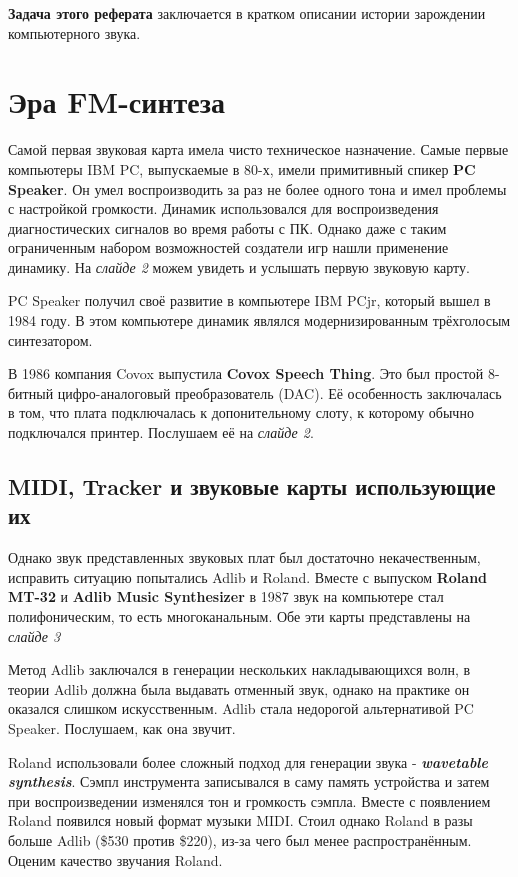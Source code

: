 \documentclass[a4paper,12pt]{extarticle}
\begin{document}
	\textbf{Задача этого реферата} заключается в кратком описании истории зарождении компьютерного звука.
	\newpage
	
	
	\section{Эра FM-синтеза}
	Самой первая звуковая карта имела чисто техническое назначение. Самые первые компьютеры IBM PC, выпускаемые в 80-х, имели примитивный спикер \textbf{PC Speaker}. Он умел воспроизводить за раз не более одного тона и имел проблемы с настройкой громкости. Динамик использовался для воспроизведения диагностических сигналов во время работы с ПК. Однако даже с таким ограниченным набором возможностей создатели игр нашли применение динамику. На \textit{слайде 2} можем увидеть и услышать первую звуковую карту.
	
	PC Speaker получил своё развитие в компьютере IBM PCjr, который вышел в 1984 году. В этом компьютере динамик являлся модернизированным трёхголосым синтезатором.
	
	В 1986 компания Covox выпустила \textbf{Covox Speech Thing}. Это был простой 8-битный цифро-аналоговый преобразователь (DAC). Её особенность заключалась в том, что плата подключалась к допонительному слоту, к которому обычно подключался принтер. Послушаем её на \textit{слайде 2}.
	
	\subsection{MIDI, Tracker и звуковые карты использующие их}
	Однако звук представленных звуковых плат был достаточно некачественным, исправить ситуацию попытались Adlib и Roland. Вместе с выпуском \textbf{Roland MT-32} и \textbf{Adlib Music Synthesizer} в 1987 звук на компьютере стал полифоническим, то есть многоканальным. Обе эти карты представлены на \textit{слайде 3}
	
	Метод Adlib заключался в генерации нескольких накладывающихся волн, в теории Adlib должна была выдавать отменный звук, однако на практике он оказался слишком искусственным. Adlib стала недорогой альтернативой PC Speaker. Послушаем, как она звучит.
	
	Roland использовали более сложный подход для генерации звука - \textbf{\textit{wavetable synthesis}}. Сэмпл инструмента записывался в саму память устройства и затем при воспроизведении изменялся тон и громкость сэмпла. Вместе с появлением Roland появился новый формат музыки MIDI. Стоил однако Roland в разы больше Adlib (\$530 против \$220), из-за чего был менее распространённым. Оценим качество звучания Roland.
	
\end{document}
